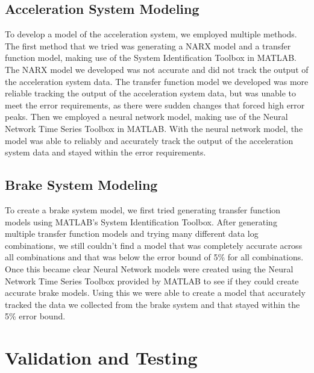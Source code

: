\documentclass[journal,twoside,web]{ieeecolor}
\begin{document}
\subsection{Acceleration System Modeling}
To develop a model of the acceleration system, we employed multiple methods. The first method that we tried was generating a NARX model and a transfer function model, making use of the System Identification Toolbox in MATLAB. The NARX model we developed was not accurate and did not track the output of the acceleration system data. The transfer function model we developed was more reliable tracking the output of the acceleration system data, but was unable to meet the error requirements, as there were sudden changes that forced high error peaks. Then we employed a neural network model, making use of the Neural Network Time Series Toolbox in MATLAB. With the neural network model, the model was able to reliably and accurately track the output of the acceleration system data and stayed within the error requirements. 

\subsection{Brake System Modeling}
To create a brake system model, we first tried generating transfer function models using MATLAB’s System Identification Toolbox. After generating multiple transfer function models and trying many different data log combinations, we still couldn’t find a model that was completely accurate across all combinations and that was below the error bound of 5\% for all combinations. Once this became clear Neural Network models were created using the Neural Network Time Series Toolbox provided by MATLAB to see if they could create accurate brake models. Using this we were able to create a model that accurately tracked the data we collected from the brake system and that stayed within the 5\% error bound.  





\section{Validation and Testing} \label{sec:simresults}


\end{document}
